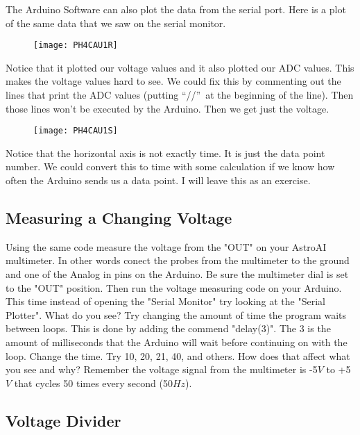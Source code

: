 The Arduino Software can also plot the data from the serial port. Here is a
plot of the same data that we saw on the serial monitor. 
\begin{figure}[h!]
	\texttt{[image: PH4CAU1R]}
\end{figure}
Notice that it plotted our voltage values and it also plotted our ADC values. This makes the voltage
values hard to see. We could fix this by commenting out the lines that print
the ADC values (putting \textquotedblleft //\textquotedblright\ at the
beginning of the line). Then those lines won't be executed by the Arduino.
Then we get just the voltage. 
\begin{figure}[h!]
	\texttt{[image: PH4CAU1S]}
\end{figure}
Notice that the horizontal axis
is not exactly time. It is just the data point number. We could convert this
to time with some calculation if we know how often the Arduino sends us a
data point. I will leave this as an exercise.




\subsection{Measuring a Changing Voltage}
Using the same code measure the voltage from the "OUT" on your AstroAI multimeter. In other words conect the probes from the multimeter to the ground and one of the Analog in pins on the Arduino. Be sure the multimeter dial is set to the "OUT" position. Then run the voltage measuring code on your Arduino. This time instead of opening the "Serial Monitor" try looking at the "Serial Plotter".  What do you see? Try changing the amount of time the program waits between loops. This is done by adding the commend "delay(3)". The 3 is the amount of milliseconds that the Arduino will wait before continuing on with the loop. Change the time. Try 10, 20, 21, 40, and others. How does that affect what you see and why? Remember the voltage signal from the multimeter is -5$\unit{V}$ to +5$\unit{V}$ that cycles 50 times every second (50$\unit{Hz}$).



	
	
	
	
\subsection{Voltage Divider}
	

